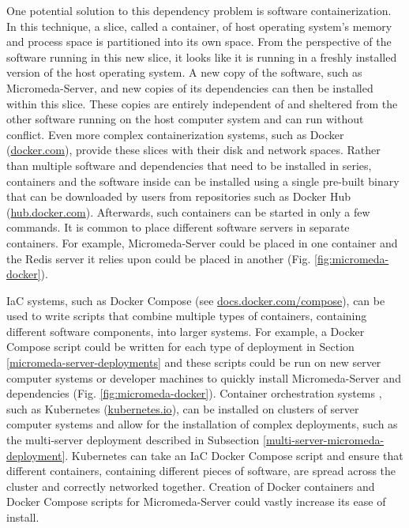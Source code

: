 One potential solution to this dependency problem is software containerization. In this technique, a slice, called a container, of host operating system's memory and process space is partitioned into its own space. From the perspective of the software running in this new slice, it looks like it is running in a freshly installed version of the host operating system. A new copy of the software, such as Micromeda-Server, and new copies of its dependencies can then be installed within this slice. These copies are entirely independent of and sheltered from the other software running on the host computer system and can run without conflict. Even more complex containerization systems, such as Docker (\href{docker.com}{docker.com}), provide these slices with their disk and network spaces. Rather than multiple software and dependencies that need to be installed in series, containers and the software inside can be installed using a single pre-built binary that can be downloaded by users from repositories such as Docker Hub (\href{hub.docker.com}{hub.docker.com}). Afterwards, such containers can be started in only a few commands. It is common to place different software servers in separate containers. For example, Micromeda-Server could be placed in one container and the Redis server it relies upon could be placed in another (Fig. \ref{fig:micromeda-docker}). 

IaC systems, such as Docker Compose (see \href{docs.docker.com/compose}{docs.docker.com/compose}), can be used to write scripts that combine multiple types of containers, containing different software components, into larger systems. For example, a Docker Compose script could be written for each type of deployment in Section \ref{micromeda-server-deployments} and these scripts could be run on new server computer systems or developer machines to quickly install Micromeda-Server and dependencies (Fig. \ref{fig:micromeda-docker}). Container orchestration systems \cite{tosatto2015container}, such as Kubernetes (\href{kubernetes.io}{kubernetes.io}), can be installed on clusters of server computer systems and allow for the installation of complex deployments, such as the multi-server deployment described in Subsection \ref{multi-server-micromeda-deployment}. Kubernetes can take an IaC Docker Compose script and ensure that different containers, containing different pieces of software, are spread across the cluster and correctly networked together. Creation of Docker containers and Docker Compose scripts for Micromeda-Server could vastly increase its ease of install.

